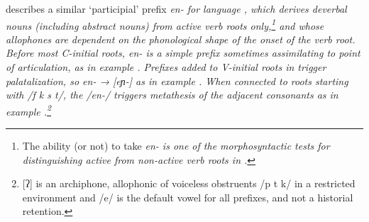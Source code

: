 
\citet[65f, 145]{Grimes1991c}
describes a similar ‘participial’ prefix \it{en-} for 
language , which derives deverbal nouns (including abstract nouns) from
active verb roots only,\footnote{
		The ability (or not) to take \it{en-} is one of the morphosyntactic
		tests for distinguishing active from non-active verb roots in .}
and whose allophones are dependent on the phonological shape
of the onset of the verb root.
Before most C-initial roots,
\it{en-} is a simple prefix sometimes assimilating to point of articulation,
as in example .
Prefixes added to V-initial roots in  trigger palatalization,
so \it{en-} → [eɲ-] as in example .
When connected to roots starting with /f k s t/,
the /en-/ triggers metathesis of the adjacent consonants as in example .\footnote{
		 [ʔ] is an archiphone,
		allophonic of voiceless obstruents /p t k/ in a restricted environment and
		/e/ is the default vowel for all  prefixes,
		and not a historial retention.}

